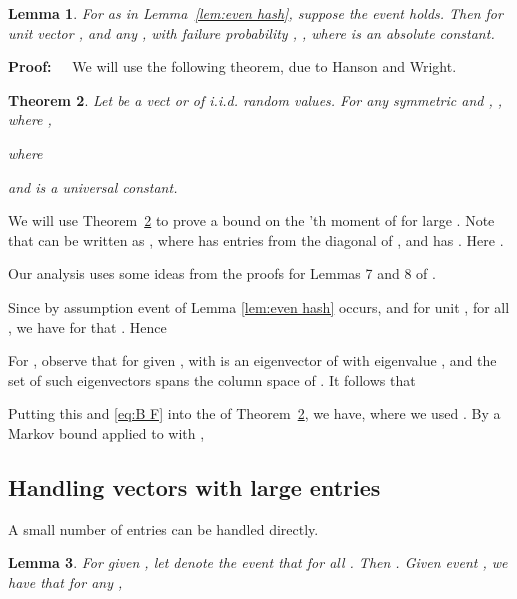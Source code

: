 \documentclass{sig-alternate}
\newtheorem{theorem}{Theorem}
\newtheorem{lemma}[theorem]{Lemma}
\def\FullBox{\hbox{\vrule width 8pt height 8pt depth 0pt}}
\def\qed{\ifmmode\qquad\FullBox\else{\unskip\nobreak\hfil
\penalty50\hskip1em\null\nobreak\hfil\FullBox
\parfillskip=0pt\finalhyphendemerits=0\endgraf}\fi}
\newenvironment{proof}{\begin{trivlist} \item {\bf Proof:~~}}
  {\qed\end{trivlist}}
\begin{document}
\begin{lemma}\label{lem:HW use}
For  as in Lemma~\ref{lem:even hash}, suppose
the event  holds. Then for unit vector , and any ,
with failure probability ,
,
where  is an absolute constant.
\end{lemma}

\begin{proof}
We will use the following theorem, due to Hanson and Wright.

\begin{theorem}\cite{HW}\label{thm:hw}
Let  be a vect
or of i.i.d.  random values. For any symmetric 
and , 
\ifSTOC
,
where
	,

\else

where

\fi
and  is a universal constant.
\end{theorem}

We will use Theorem~\ref{thm:hw} to prove a bound on the 'th moment
of  for large . Note that
 can be written as , where  has entries
from the diagonal of , and 
 has .
Here .

Our analysis uses some ideas from the proofs for Lemmas 7 and 8 of \cite{KN12}.

Since by assumption event  of Lemma \ref{lem:even hash} occurs,
and for unit ,  for all ,
we have for  that
. Hence

For , observe that for given ,
 with  is an eigenvector of 
with eigenvalue ,
and the set of such eigenvectors spans the column space of . It follows
that 

Putting this and \eqref{eq:B F} into the  of Theorem~\ref{thm:hw},
we have, 
where we used . 
By a Markov bound applied to 
with ,

\end{proof}







\subsection{Handling vectors with large entries}\label{sec:large}

A small number of entries can be handled directly.

\begin{lemma}\label{lem:birthday}
For given , let  denote the event that  for all .
Then .
Given event , we have that for any ,

\end{lemma}
\end{document}
